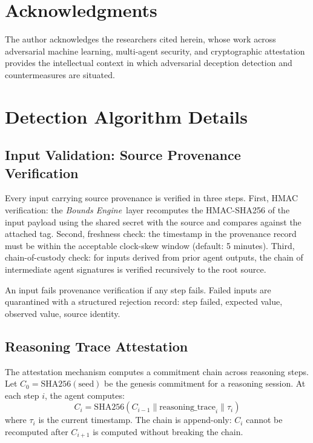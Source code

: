 \documentclass[12pt]{article}
\newcommand{\bounds}{\textit{Bounds Engine}}
\begin{document}
\section*{Acknowledgments}

The author acknowledges the researchers cited herein, whose work across adversarial machine learning, multi-agent security, and cryptographic attestation provides the intellectual context in which adversarial deception detection and countermeasures are situated.


\section{Detection Algorithm Details}
\label{sec:detection-algorithms}

\subsection{Input Validation: Source Provenance Verification}
Every input carrying source provenance is verified in three steps. First, HMAC verification: the \bounds\ layer recomputes the HMAC-SHA256 of the input payload using the shared secret with the source and compares against the attached tag. Second, freshness check: the timestamp in the provenance record must be within the acceptable clock-skew window (default: 5 minutes). Third, chain-of-custody check: for inputs derived from prior agent outputs, the chain of intermediate agent signatures is verified recursively to the root source.

An input fails provenance verification if any step fails. Failed inputs are quarantined with a structured rejection record: step failed, expected value, observed value, source identity.

\subsection{Reasoning Trace Attestation}
The attestation mechanism computes a commitment chain across reasoning steps. Let $C_0 = \text{SHA256}(\text{seed})$ be the genesis commitment for a reasoning session. At each step $i$, the agent computes:
$$C_i = \text{SHA256}(C_{i-1} \parallel \text{reasoning\_trace}_i \parallel \tau_i)$$
where $\tau_i$ is the current timestamp. The chain is append-only: $C_i$ cannot be recomputed after $C_{i+1}$ is computed without breaking the chain.
\end{document}
